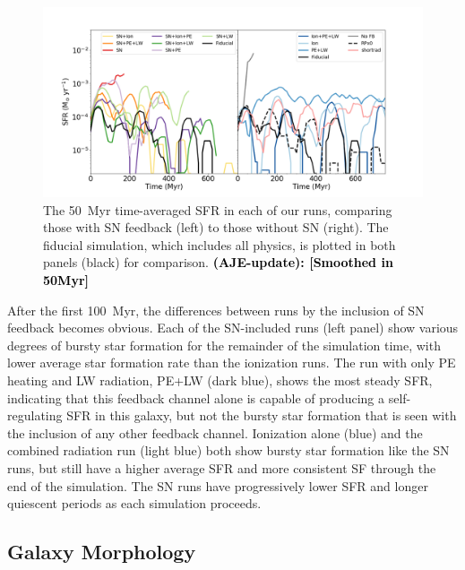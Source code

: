 \documentclass[twocolumn]{aastex62}
\newcommand{\fiducialstyle}{black}
\newcommand{\radstyle}{light blue}
\newcommand{\ionstyle}{blue}
\newcommand{\pelwstyle}{dark blue}
\newcommand{\aje}[1]{\textcolor{blue}{\textbf{(AJE: #1)}}}
\newcommand{\changed}[1]{\textcolor{black}{\textbf{(AJE-update): #1}}}
\begin{document}
\begin{figure}
  \centering
  \includegraphics[width=0.98\linewidth]{figures/physics_comparison_sfr}
  \caption{The 50~Myr time-averaged SFR in each of our runs, comparing those with SN feedback (left) to those without SN (right). The fiducial simulation, which includes all physics, is plotted in both panels (\fiducialstyle) for comparison. \changed{[Smoothed in 50Myr]}}
  \label{fig:SFR}
\end{figure}

After the first 100~Myr, the differences between runs by the inclusion of SN feedback becomes obvious. 
Each of the SN-included runs (left panel) show various degrees of bursty star formation for the remainder of the simulation time, with lower average star formation rate than the ionization runs. The run with only PE heating and LW radiation, PE+LW (\pelwstyle), shows the most steady SFR, indicating that this feedback channel alone is capable of producing a self-regulating SFR in this galaxy, but not the bursty star formation that is seen with the inclusion of any other feedback channel. Ionization alone (\ionstyle) and the combined radiation run (\radstyle) both show bursty star formation like the SN runs, but still have a higher average SFR and more consistent SF through the end of the simulation. The SN runs have progressively lower SFR and longer quiescent periods as each simulation proceeds.


\subsection{Galaxy Morphology}
\label{sec:morphology}
\end{document}
